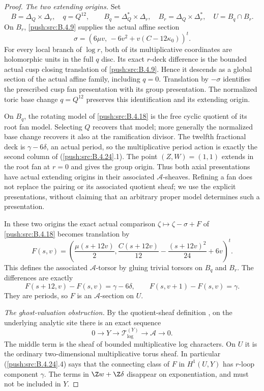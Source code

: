 \begin{proof}
\emph{The two extending origins.}
Set
\[
 B=\Delta_Q\times\Delta_r,\quad q=Q^{12},\qquad
 B_q=\Delta_Q^*\times\Delta_r,\quad
 B_r=\Delta_Q\times\Delta_r^*,\quad U=B_q\cap B_r.
\]
On $B_r$, \ref{push:src:B.4.9} supplies the actual affine section
\[
 \sigma=
 \left(6\mu v,\,-6v^2+v(C-12\kappa_0)\right)^t.
 \tag{B.4.24.2}
\]
For every local branch of $\log r$, both of its
multiplicative coordinates are holomorphic units
in the full $q$ disc. Its exact $r$-deck difference
is the bounded actual cusp closing translation
of \ref{push:src:B.4.9}. Hence it descends as a global section
of the actual affine family, including $q=0$.
Translation by $-\sigma$ identifies the prescribed
cusp fan presentation with its group presentation.
The normalized toric base change $q=Q^{12}$ preserves
this identification and its extending origin.

On $B_q$, the rotating model of \ref{push:src:B.4.18} is the
free cyclic quotient of its root fan model. Selecting
$Q$ recovers that model; more generally the normalized
base change recovers it also at the ramification
divisor. The twelfth fractional deck is
$\gamma-6\delta$, an actual period, so the
multiplicative period action is exactly the second
column of (\ref{push:src:B.4.24}.1). The point $(Z,W)=(1,1)$
extends in the root fan at $r=0$ and gives the
group origin. Thus both axial presentations have
actual extending origins in their associated
$\mathcal A$-sheaves. Refining a fan does not
replace the pairing or its associated quotient
sheaf; we use the explicit presentations, without
claiming that an arbitrary proper model determines
such a presentation.

In these two origins the exact actual comparison
$\zeta\mapsto\zeta-\sigma+F$ of \ref{push:src:B.4.18} becomes
translation by
\[
 F(s,v)=\left(
 \frac{\mu(s+12v)}2,
 \frac{C(s+12v)}{12}-\frac{(s+12v)^2}{24}+6v
 \right)^t.
 \tag{B.4.24.3}
\]
This defines the associated $\mathcal A$-torsor
by gluing trivial torsors on $B_q$ and $B_r$.
The differences are exactly
\[
 F(s+12,v)-F(s,v)=\gamma-6\delta,
 \qquad F(s,v+1)-F(s,v)=\gamma.
 \tag{B.4.24.4}
\]
They are periods, so $F$ is an $\mathcal A$-section
on $U$.

\emph{The ghost-valuation obstruction.}
By the quotient-sheaf definition
\citep[Sections 1.3.1--1.3.4, pp.~81--82]{KKN2008Root},
on the underlying analytic site there is an exact sequence
\[
 0\longrightarrow Y\longrightarrow
 \mathcal T_{\log}^{(Y)}\longrightarrow
 \mathcal A\longrightarrow0.
 \tag{B.4.24.5}
\]
The middle term is the sheaf of bounded multiplicative
log characters. On $U$ it is the ordinary
two-dimensional multiplicative torus sheaf.
In particular (\ref{push:src:B.4.24}.4) says that the connecting
class of $F$ in $H^1(U,Y)$ has $r$-loop component
$\gamma$. The terms in $\Z w+\Z\delta$ disappear
on exponentiation, and must not be included in $Y$.


\end{proof}
